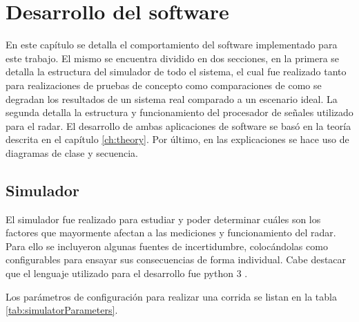 \chapter{Desarrollo del software} \label{ch:softwareDevelopment}

\ifpdf
    \graphicspath{{Chapter4/Figs/Raster/}{Chapter4/Figs/PDF/}{Chapter4/Figs/}}
\else
    \graphicspath{{Chapter4/Figs/Vector/}{Chapter4/Figs/}}
\fi

En este capítulo se detalla el comportamiento del software implementado para este trabajo. El mismo se encuentra dividido en dos secciones, en la primera se detalla la estructura del simulador de todo el sistema, el cual fue realizado tanto para realizaciones de pruebas de concepto como comparaciones de como se degradan los resultados de un sistema real comparado a un escenario ideal. La segunda detalla la estructura y funcionamiento del procesador de señales utilizado para el radar. El desarrollo de ambas aplicaciones de software se basó en la teoría descrita en el capítulo \ref{ch:theory}. Por último, en las explicaciones se hace uso de diagramas de clase y secuencia.


\section{Simulador}

El simulador fue realizado para estudiar y poder determinar cuáles son los factores que mayormente afectan a las mediciones y funcionamiento del radar. Para ello se incluyeron algunas fuentes de incertidumbre, colocándolas como configurables para ensayar sus consecuencias de forma individual. Cabe destacar que el lenguaje utilizado para el desarrollo fue python 3 \cite{python3}.

Los parámetros de configuración para realizar una corrida se listan en la tabla \ref{tab:simulatorParameters}.


